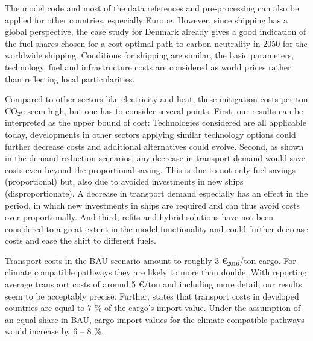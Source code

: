 \documentclass[article]{elsarticle}
\begin{document}
The model code and most of the data references and pre-processing can also be applied for other countries, especially Europe. However, since shipping has a global perspective, the case study for Denmark already gives a good indication of the fuel shares chosen for a cost-optimal path to carbon neutrality in 2050 for the worldwide shipping. Conditions for shipping are similar, the basic parameters, technology, fuel and infrastructure costs are considered as world prices rather than reflecting local particularities. %

Compared to other sectors like electricity and heat, these mitigation costs per ton CO$_2$e seem high, but one has to consider several points. First, our results can be interpreted as the upper bound of cost: Technologies considered are all applicable today, developments in other sectors applying similar technology options could further decrease costs and additional alternatives could evolve. Second, as shown in the demand reduction scenarios, any decrease in transport demand would save costs even beyond the proportional saving. This is due to not only fuel savings (proportional) but, also due to avoided investments in new ships (disproportionate). A decrease in transport demand especially has an effect in the period, in which new investments in ships are required and can thus avoid costs over-proportionally. And third, refits and hybrid solutions have not been considered to a great extent in the model functionality and could further decrease costs and ease the shift to different fuels.

Transport costs in the BAU scenario amount to roughly 3 \euro$_{2016}$/ton cargo. For climate compatible pathways they are likely to more than double. With \citet[p.~50]{UNCTAD2015} reporting average transport costs of around 5 \euro/ton and including more detail, our results seem to be acceptably precise. Further, \cite[p.~55]{UNCTAD2015} states that transport costs in developed countries are equal to 7 \% of the cargo's import value. Under the assumption of an equal share in BAU, cargo import values for the climate compatible pathways would increase by 6 -- 8 \%.

\end{document}
